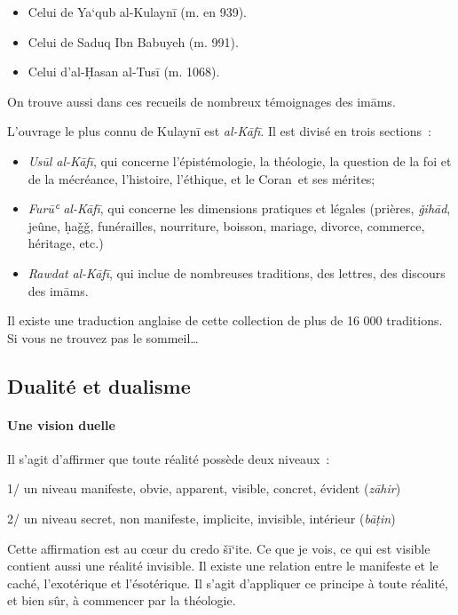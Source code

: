 \begin{itemize}
\item
  Celui de Ya`qub al-Kulaynī (m. en 939).
\item
  Celui de Saduq Ibn Babuyeh (m. 991).
\item
  Celui d'al-Ḥasan al-Tusī (m. 1068).
\end{itemize}

On trouve aussi dans ces recueils de nombreux témoignages des imāms.

L'ouvrage le plus connu de Kulaynī est \emph{al-Kāfī}. Il est divisé en
trois sections~:

\begin{itemize}
\item
  \emph{Usūl al-Kāfī}, qui concerne l'épistémologie, la théologie, la
  question de la foi et de la mécréance, l'histoire, l'éthique, et le
  Coran~et ses mérites;
\item
  \emph{Furūʿ al-Kāfī}, qui concerne les dimensions pratiques et légales
  (prières, \emph{ǧihād}, jeûne, ḥaǧǧ, funérailles, nourriture, boisson,
  mariage, divorce, commerce, héritage, etc.)
\item
  \emph{Rawdat} \emph{al-Kāfī}, qui inclue de nombreuses traditions, des
  lettres, des discours des imāms.
\end{itemize}

Il existe une traduction anglaise de cette collection de plus de 16 000
traditions. Si vous ne trouvez pas le sommeil\ldots{}
 
\subsection{ Dualité et dualisme}\label{dualituxe9-et-dualisme}

 
\paragraph{ Une vision duelle}\label{une-vision-duelle}

Il s'agit d'affirmer que toute réalité possède deux niveaux~:

1/ un niveau manifeste, obvie, apparent, visible, concret, évident
(\emph{zāhir})

2/ un niveau secret, non manifeste, implicite, invisible, intérieur
(\emph{bāṭin})

Cette affirmation est au cœur du credo šī`ite. Ce que je vois, ce qui
est visible contient aussi une réalité invisible. Il existe une relation
entre le manifeste et le caché, l'exotérique et l'ésotérique. Il s'agit
d'appliquer ce principe à toute réalité, et bien sûr, à commencer par la
théologie.

